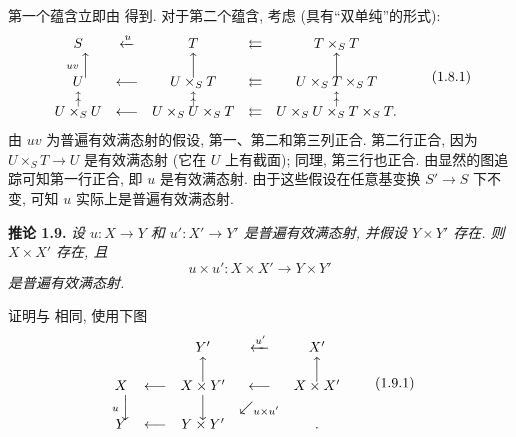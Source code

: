 第一个蕴含立即由  得到.
对于第二个蕴含, 考虑 
(具有``双单纯''的形式):
\[
\begin{array}{ccccc}
  S & \xleftarrow{u} & T & \leftleftarrows & T\times_ST \\
  \scriptstyle uv\,\Big\uparrow
    & & \Big\uparrow & & \Big\uparrow \\[-0.25em]
  U & \longleftarrow & U\times_ST
    & \leftleftarrows & U\times_ST\times_ST \\
  \substack{\uparrow\\[-0.6ex]\uparrow}
    & & \substack{\uparrow\\[-0.6ex]\uparrow}
    & & \substack{\uparrow\\[-0.6ex]\uparrow} \\[-0.25em]
  U\times_SU & \longleftarrow & U\times_SU\times_ST
    & \leftleftarrows & U\times_SU\times_ST\times_ST .
\end{array}
\tag{1.8.1}\label{sga3:iv:proposition:1:8:eq:1:8:1:01}
\]
由 \(uv\) 为普遍有效满态射的假设, 第一、第二和第三列正合.
第二行正合, 因为 \(U\times_ST\to U\) 是有效满态射
(它在 \(U\) 上有截面); 同理, 第三行也正合.
由显然的图追踪可知第一行正合, 即 \(u\) 是有效满态射.
由于这些假设在任意基变换 \(S'\to S\) 下不变,
可知 \(u\) 实际上是普遍有效满态射.

\medskip
\noindent{}\textbf{推论 1.9.}
\textit{设 \(u:X\to Y\) 和 \(u':X'\to Y'\) 是普遍有效满态射,
并假设 \(Y\times Y'\) 存在. 则 \(X\times X'\) 存在, 且}
\[
  u\times u':X\times X'\longrightarrow Y\times Y'
\]
\textit{是普遍有效满态射.}

证明与  相同, 使用下图
\[
\begin{array}{ccccc}
   & & Y' & \xleftarrow{u'} & X' \\
   & & \Big\uparrow & & \Big\uparrow \\[-0.25em]
  X & \longleftarrow & X\times Y' & \longleftarrow & X\times X' \\
  \scriptstyle u\,\Big\downarrow
    & & \Big\downarrow & \swarrow_{\scriptstyle u\times u'} & \\[-0.25em]
  Y & \longleftarrow & Y\times Y' & & .
\end{array}
\tag{1.9.1}\label{sga3:iv:corollary:1:9:eq:1:9:1:01}
\]

